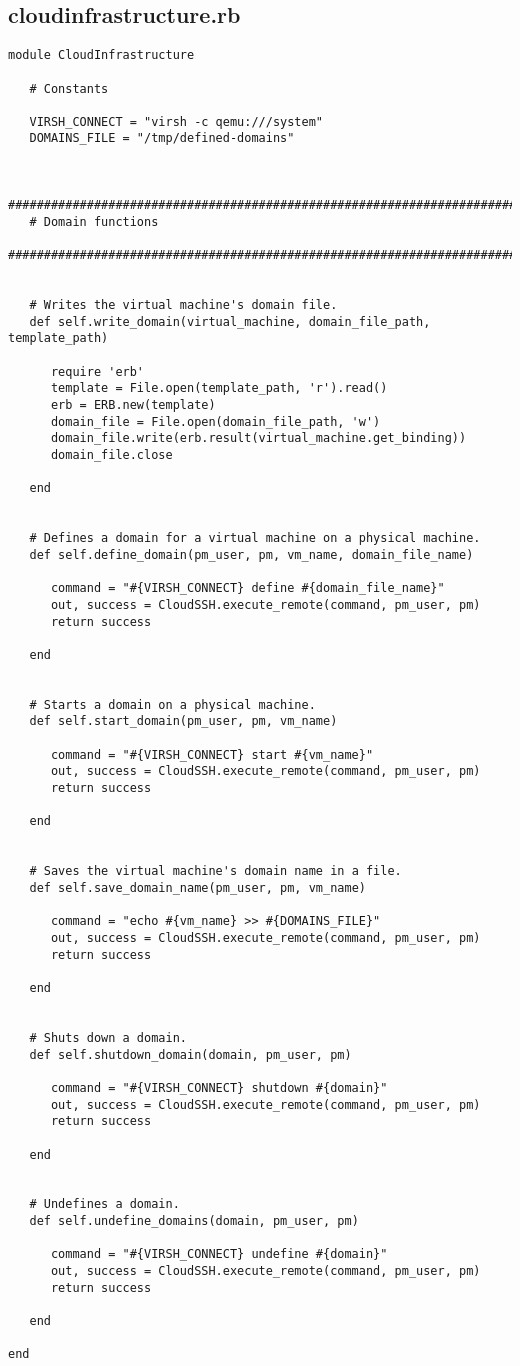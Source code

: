 \subsection{cloudinfrastructure.rb}


\begin{lstlisting}
module CloudInfrastructure

   # Constants

   VIRSH_CONNECT = "virsh -c qemu:///system"
   DOMAINS_FILE = "/tmp/defined-domains"


   #############################################################################
   # Domain functions
   #############################################################################


   # Writes the virtual machine's domain file.
   def self.write_domain(virtual_machine, domain_file_path, template_path)

      require 'erb'
      template = File.open(template_path, 'r').read()
      erb = ERB.new(template)
      domain_file = File.open(domain_file_path, 'w')
      domain_file.write(erb.result(virtual_machine.get_binding))
      domain_file.close

   end


   # Defines a domain for a virtual machine on a physical machine.
   def self.define_domain(pm_user, pm, vm_name, domain_file_name)

      command = "#{VIRSH_CONNECT} define #{domain_file_name}"
      out, success = CloudSSH.execute_remote(command, pm_user, pm)
      return success
      
   end


   # Starts a domain on a physical machine.
   def self.start_domain(pm_user, pm, vm_name)

      command = "#{VIRSH_CONNECT} start #{vm_name}"
      out, success = CloudSSH.execute_remote(command, pm_user, pm)
      return success
      
   end


   # Saves the virtual machine's domain name in a file.
   def self.save_domain_name(pm_user, pm, vm_name)

      command = "echo #{vm_name} >> #{DOMAINS_FILE}"
      out, success = CloudSSH.execute_remote(command, pm_user, pm)
      return success

   end


   # Shuts down a domain.
   def self.shutdown_domain(domain, pm_user, pm)

      command = "#{VIRSH_CONNECT} shutdown #{domain}"
      out, success = CloudSSH.execute_remote(command, pm_user, pm)
      return success

   end


   # Undefines a domain.
   def self.undefine_domains(domain, pm_user, pm)

      command = "#{VIRSH_CONNECT} undefine #{domain}"
      out, success = CloudSSH.execute_remote(command, pm_user, pm)
      return success

   end

end
\end{lstlisting}


